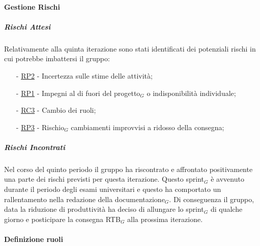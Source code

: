 \documentclass[10pt]{article}
\begin{document}
{{{{{{    \paragraph{Gestione Rischi}\mbox{}
    \vspace{-1em}
    \subparagraph*{Rischi Attesi}\mbox{}
    
    Relativamente alla quinta iterazione sono stati identificati dei potenziali rischi in cui potrebbe imbattersi il gruppo:
    \vspace{-0.5em}
    \begin{itemize}
    \setlength\itemsep{-0.2em}
    \item [-] \hyperref[RP2]{RP2} - Incertezza sulle stime delle attività;
    \item [-] \hyperref[RP1]{RP1} - Impegni al di fuori del progetto$_G$ o indisponibilità individuale;
    \item [-] \hyperref[RC3]{RC3} - Cambio dei ruoli;
    \item [-] \hyperref[RP3]{RP3} - Rischio$_G$ cambiamenti improvvisi a ridosso della consegna;
    \end{itemize}

    \subparagraph*{Rischi Incontrati}\mbox{}

    Nel corso del quinto periodo il gruppo ha riscontrato e affrontato positivamente una parte dei rischi previsti per questa iterazione.
    Questo sprint$_G$ è avvenuto durante il periodo degli esami universitari e questo ha comportato un rallentamento nella redazione della documentazione$_G$.
    Di conseguenza il gruppo, data la riduzione di produttività ha deciso di allungare lo sprint$_G$ di qualche giorno e posticipare la consegna RTB$_G$ alla prossima iterazione.

    \paragraph{Definizione ruoli}\mbox{}\vspace{0.4em}
    
}}}}}}
\end{document}
